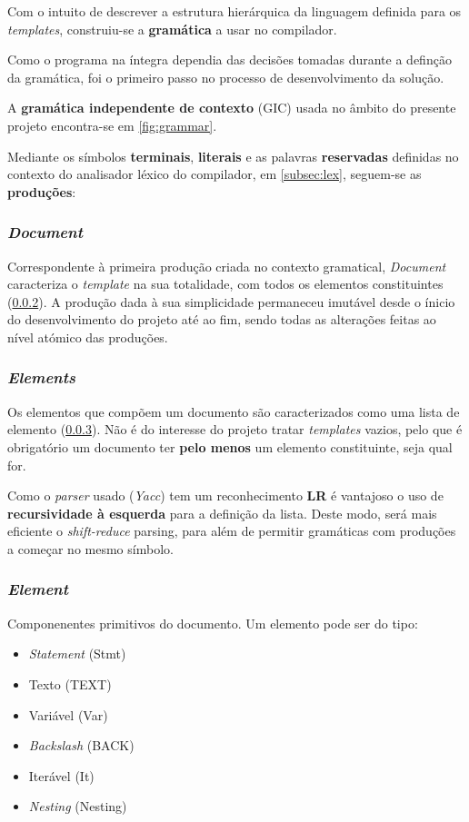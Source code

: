 \documentclass[../relatorio.tex]{subfiles}
\begin{document}
Com o intuito de descrever a estrutura hierárquica da linguagem
definida para os \textit{templates}, construiu-se a \textbf{gramática} 
a usar no compilador. 

Como o programa na íntegra dependia das decisões tomadas durante
a definção da gramática, foi o primeiro passo no processo de desenvolvimento
da solução. 

A \textbf{gramática independente de contexto} (GIC) usada 
no âmbito do presente projeto encontra-se em \ref{fig:grammar}.

Mediante os símbolos \textbf{terminais}, \textbf{literais} e as palavras 
\textbf{reservadas} definidas no contexto do analisador léxico do 
compilador, em \ref{subsec:lex}, seguem-se as \textbf{produções}:

\subsubsection{\textit{Document}}\label{grm:doc}
Correspondente à primeira produção criada no contexto gramatical,
\textit{Document} caracteriza o \textit{template} na sua totalidade,
com todos os elementos constituintes (\ref{grm:elems}).
A produção dada à sua simplicidade permaneceu imutável desde o ínicio
do desenvolvimento do projeto até ao fim, sendo todas as alterações 
feitas ao nível atómico das produções.

\subsubsection{\textit{Elements}} \label{grm:elems}
Os elementos que compõem um documento são caracterizados como uma lista 
de elemento (\ref{grm:elem}). 
Não é do interesse do projeto tratar \textit{templates} vazios, pelo que 
é obrigatório um documento ter \textbf{pelo menos} um 
elemento constituinte, seja qual for. 

Como o \textit{parser} usado (\textit{Yacc}) tem um reconhecimento \textbf{LR}
é vantajoso o uso de \textbf{recursividade à esquerda} para a definição da lista.
Deste modo, será mais eficiente o \textit{shift-reduce} parsing, para além
de permitir gramáticas com produções a começar no mesmo símbolo.

\subsubsection{\textit{Element}}\label{grm:elem}
Componenentes primitivos do documento. 
Um elemento pode ser do tipo:
\begin{itemize}
    \item \textit{Statement}    (Stmt)
    \item Texto                 (TEXT)
    \item Variável              (Var)
    \item \textit{Backslash}    (BACK)
    \item Iterável              (It)
    \item \textit{Nesting}      (Nesting)
\end{itemize}
\end{document}
